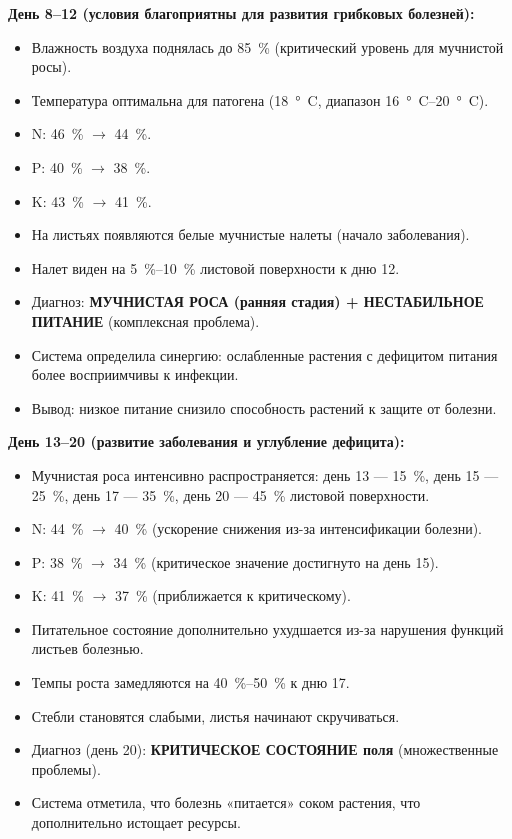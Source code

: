 \textbf{День 8--12 (условия благоприятны для развития грибковых болезней):}
\begin{itemize}
    \item Влажность воздуха поднялась до \SI{85}{\percent} (критический уровень для мучнистой росы).
    \item Температура оптимальна для патогена (\SI{18}{\degree C}, диапазон \SIrange{16}{20}{\degree C}).
    \item N: \SI{46}{\percent} $\to$ \SI{44}{\percent}.
    \item P: \SI{40}{\percent} $\to$ \SI{38}{\percent}.
    \item K: \SI{43}{\percent} $\to$ \SI{41}{\percent}.
    \item На листьях появляются белые мучнистые налеты (начало заболевания).
    \item Налет виден на \SIrange{5}{10}{\percent} листовой поверхности к дню \num{12}.
    \item Диагноз: \textbf{МУЧНИСТАЯ РОСА (ранняя стадия) + НЕСТАБИЛЬНОЕ ПИТАНИЕ} (комплексная проблема).
    \item Система определила синергию: ослабленные растения с дефицитом питания более восприимчивы к инфекции.
    \item Вывод: низкое питание снизило способность растений к защите от болезни.
\end{itemize}

\textbf{День 13--20 (развитие заболевания и углубление дефицита):}
\begin{itemize}
    \item Мучнистая роса интенсивно распространяется: день 13 --- \SI{15}{\percent}, день 15 --- \SI{25}{\percent}, день 17 --- \SI{35}{\percent}, день 20 --- \SI{45}{\percent} листовой поверхности.
    \item N: \SI{44}{\percent} $\to$ \SI{40}{\percent} (ускорение снижения из-за интенсификации болезни).
    \item P: \SI{38}{\percent} $\to$ \SI{34}{\percent} (критическое значение достигнуто на день \num{15}).
    \item K: \SI{41}{\percent} $\to$ \SI{37}{\percent} (приближается к критическому).
    \item Питательное состояние дополнительно ухудшается из-за нарушения функций листьев болезнью.
    \item Темпы роста замедляются на \SIrange{40}{50}{\percent} к дню \num{17}.
    \item Стебли становятся слабыми, листья начинают скручиваться.
    \item Диагноз (день \num{20}): \textbf{КРИТИЧЕСКОЕ СОСТОЯНИЕ поля} (множественные проблемы).
    \item Система отметила, что болезнь «питается» соком растения, что дополнительно истощает ресурсы.
\end{itemize}

